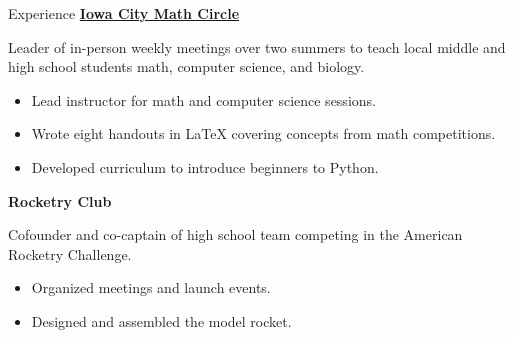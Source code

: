 \begin{rubric}{Experience}
\entry*[2021-present] \textbf{\href{https://iowacitymathcircle.org}{Iowa City Math Circle}} 
    \par Leader of in-person weekly meetings over two summers to teach local middle and high school students math, computer science, and biology. 
    \begin{itemize}
        \item Lead instructor for math and computer science sessions.
        \item Wrote eight handouts in LaTeX covering concepts from math competitions. 
        \item Developed curriculum to introduce beginners to Python.
    \end{itemize}
\entry*[2021-present] \textbf{Rocketry Club}
    \par Cofounder and co-captain of high school team competing in the American Rocketry Challenge. 
    \begin{itemize}
        \item Organized meetings and launch events. 
        \item Designed and assembled the model rocket.
    \end{itemize}
\end{rubric}